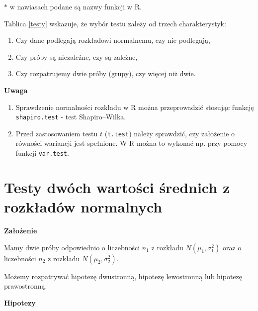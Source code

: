 \documentclass[12pt,B5paper,]{book}
\providecommand{\tightlist}{%
  \setlength{\itemsep}{0pt}\setlength{\parskip}{0pt}}
\begin{document}
\(\ast\) w nawiasach podane są nazwy funkcji w R.

Tablica \ref{testy} wskazuje, że wybór testu zależy od trzech
charakterystyk:

\begin{enumerate}
\def\labelenumi{\arabic{enumi}.}
\tightlist
\item
  Czy dane podlegają rozkładowi normalnemu, czy nie podlegają,
\item
  Czy próby są niezależne, czy są zależne,
\item
  Czy rozpatrujemy dwie próby (grupy), czy więcej niż dwie.
\end{enumerate}

\vspace{0.8cm} \textbf{Uwaga}

\begin{enumerate}
\def\labelenumi{\arabic{enumi})}
\item
  Sprawdzenie normalności rozkładu w R można przeprowadzić stosując
  funkcję \texttt{shapiro.test} - test Shapiro--Wilka.
\item
  Przed zastosowaniem testu \(t\) (\texttt{t.test}) należy sprawdzić,
  czy założenie o równości wariancji jest spełnione. W R można to
  wykonać np. przy pomocy funkcji \texttt{var.test}.
\end{enumerate}

\section{Testy dwóch wartości średnich z rozkładów
normalnych}\label{testy-dwoch-wartosci-srednich-z-rozkadow-normalnych}

\textbf{Założenie}

Mamy dwie próby odpowiednio o liczebności \(n_1\) z rozkładu
\(N(\mu_1, \sigma_1^2)\) oraz o liczebności \(n_2\) z rozkładu
\(N(\mu_2, \sigma_2^2)\).

Możemy rozpatrywać hipotezę dwustronną, hipotezę lewostronną lub
hipotezę prawostronną.

\vspace{0.8cm} \textbf{Hipotezy}
\end{document}
